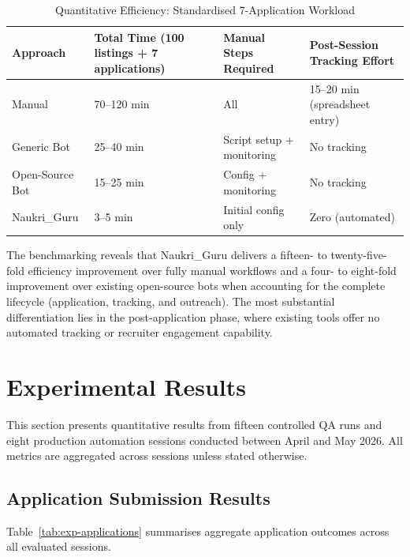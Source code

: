 \documentclass[12pt, a4paper, oneside]{report}
\begin{document}
\begin{table}[H]
\centering
\caption{Quantitative Efficiency: Standardised 7-Application Workload}
\label{tab:bench-quant}
\small
\begin{tabularx}{\textwidth}{|l|X|X|X|}
\hline
\textbf{Approach} & \textbf{Total Time (100 listings + 7 applications)} & \textbf{Manual Steps Required} & \textbf{Post-Session Tracking Effort} \\
\hline
Manual & 70--120 min & All & 15--20 min (spreadsheet entry) \\
\hline
Generic Bot & 25--40 min & Script setup + monitoring & No tracking \\
\hline
Open-Source Bot & 15--25 min & Config + monitoring & No tracking \\
\hline
Naukri\_Guru & 3--5 min & Initial config only & Zero (automated) \\
\hline
\end{tabularx}
\end{table}

The benchmarking reveals that Naukri\_Guru delivers a fifteen- to twenty-five-fold efficiency improvement over fully manual workflows and a four- to eight-fold improvement over existing open-source bots when accounting for the complete lifecycle (application, tracking, and outreach). The most substantial differentiation lies in the post-application phase, where existing tools offer no automated tracking or recruiter engagement capability.


\section{Experimental Results}
\label{sec:experimental-results}

This section presents quantitative results from fifteen controlled QA runs and eight production automation sessions conducted between April and May 2026. All metrics are aggregated across sessions unless stated otherwise.

\subsection{Application Submission Results}

Table~\ref{tab:exp-applications} summarises aggregate application outcomes across all evaluated sessions.
\end{document}
